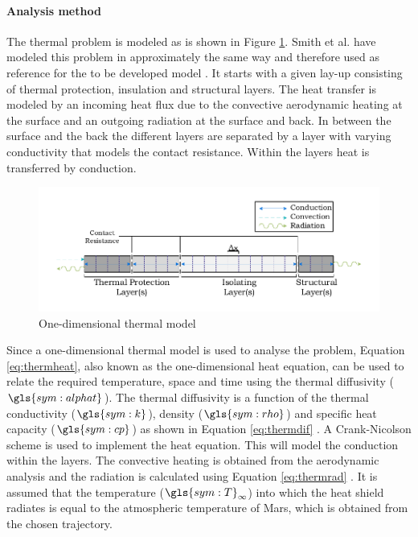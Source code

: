 \paragraph{Analysis method}
The thermal problem is modeled as is shown in Figure \ref{fig:1dmodelthermal}. Smith et al. have modeled this problem in approximately the same way and therefore used as reference for the to be developed model \cite{Smith2011}. It starts with a given lay-up consisting of thermal protection, insulation and structural layers. The heat transfer is modeled by an incoming heat flux due to the convective aerodynamic heating at the surface and an outgoing radiation at the surface and back. In between the surface and the back the different layers are separated by a layer with varying conductivity that models the contact resistance. Within the layers heat is transferred by conduction.

\begin{figure}[h]
	\centering
	\includegraphics{./Figure/Thermal/1dmodelthermal.pdf}
	\caption{One-dimensional thermal model}
	\label{fig:1dmodelthermal}
\end{figure}

Since a one-dimensional thermal model is used to analyse the problem, Equation \ref{eq:thermheat}, also known as the one-dimensional heat equation, can be used to relate the required temperature, space and time using the thermal diffusivity ($\gls{sym:alphat}$). The thermal diffusivity is a function of the thermal conductivity ($\gls{sym:k}$), density ($\gls{sym:rho}$) and specific heat capacity ($\gls{sym:cp}$) as shown in Equation \ref{eq:thermdif} \cite{Holman2002}. A Crank-Nicolson scheme is used to implement the heat equation. This will model the conduction within the layers. The convective heating is obtained from the aerodynamic analysis and the radiation is calculated using Equation \ref{eq:thermrad} \cite{Holman2002}. It is assumed that the temperature ($\gls{sym:T}_\infty$) into which the heat shield radiates is equal to the atmospheric temperature of Mars, which is obtained from the chosen trajectory.

